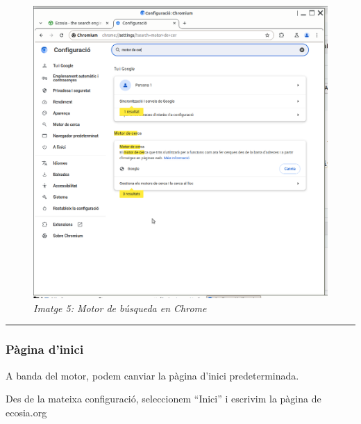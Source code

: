 \documentclass[
  a4paper,
]{article}
\begin{document}
\begin{figure}
\centering
\includegraphics{png/2-Chrome-Motor.png}
\caption{\emph{Imatge 5: Motor de búsqueda en Chrome}}
\end{figure}

\begin{center}\rule{0.5\linewidth}{0.5pt}\end{center}

\subsubsection{Pàgina d'inici}\label{puxe0gina-dinici-1}

A banda del motor, podem canviar la pàgina d'inici predeterminada.

Des de la mateixa configuració, seleccionem ``Inici'' i escrivim la
pàgina de ecosia.org
\end{document}
